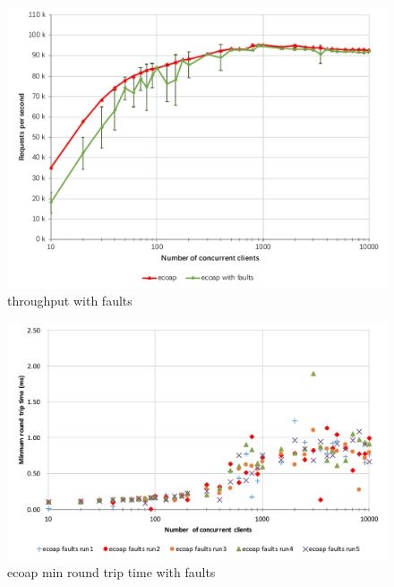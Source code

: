 \begin{figure}[!htbp]
\centering
\includegraphics[scale = 0.8]{throughput_with_faults}
\caption{throughput with faults}
\label{fig:throughput_with_faults}
\end{figure}

\begin{figure}[!htbp]
\centering
\includegraphics[scale = 0.8]{ecoap_min_round_trip_time_faults}
\caption{ecoap min round trip time with faults}
\label{fig:ecoap_min_round_trip_time_faults}
\end{figure}

